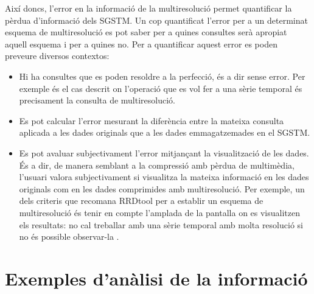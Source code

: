 Així doncs, l'error en la informació de la multiresolució permet
quantificar la pèrdua d'informació dels \gls{SGSTM}. Un cop
quantificat l'error per a un determinat esquema de multiresolució es
pot saber per a quines consultes serà apropiat aquell esquema i per a
quines no. Per a quantificar aquest error es poden preveure diversos
contextos:
\begin{itemize}
\item Hi ha consultes que es poden resoldre a la perfecció, és a dir
  sense error. Per exemple és el cas descrit on l'operació que es vol
  fer a una sèrie temporal és precisament la consulta de
  multiresolució.

\item Es pot calcular l'error mesurant la diferència entre la mateixa
  consulta aplicada a les dades originals que a les dades
  emmagatzemades en el \gls{SGSTM}.

\item Es pot avaluar subjectivament l'error mitjançant la
  visualització de les dades. És a dir, de manera semblant a la
  compressió amb pèrdua de multimèdia, l'usuari valora subjectivament
  si visualitza la mateixa informació en les dades originals com en
  les dades comprimides amb multiresolució. Per exemple, un dels
  criteris que recomana RRDtool per a establir un esquema de
  multiresolució és tenir en compte l'amplada de la pantalla on es
  visualitzen els resultats: no cal treballar amb una sèrie temporal
  amb molta resolució si no és possible observar-la \parencite[Rates,
  normalizing and consolidating]{vandenbogaerdt} .

\end{itemize}






\section{Exemples d'anàlisi de la informació}


